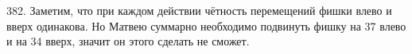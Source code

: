 382. Заметим, что при каждом действии чётность перемещений фишки влево и вверх одинакова. Но Матвею суммарно необходимо подвинуть фишку на 37 влево и на 34 вверх, значит он этого сделать не сможет.\\
